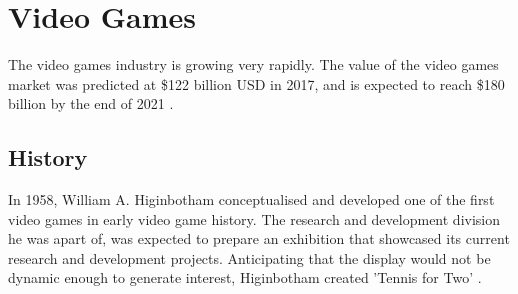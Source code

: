 \documentclass[a4paper,11.5pt]{report}
\numberwithin{figure}{section}
\numberwithin{table}{section}
\numberwithin{equation}{section}
\numberwithin{equation}{section}
\begin{document}


\section{Video Games}




The video games industry is growing very rapidly. The value of the video games market was predicted at \$122 billion USD in 2017, and is expected to reach \$180 billion by the end of 2021 \cite{vgamesResearch}.

\subsection{History}

In 1958, William A. Higinbotham conceptualised and developed one of the first video games in early video game history. The research and development division he was apart of, was expected to prepare an exhibition that showcased its current research and development projects. Anticipating that the display would not be dynamic enough to generate interest, Higinbotham created 'Tennis for Two' \cite{historyVideoGames}.
\end{document}
